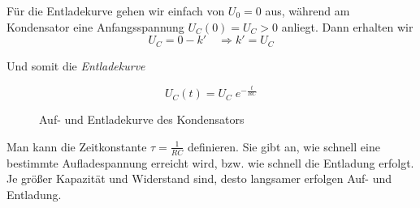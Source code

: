 \documentclass[a4paper,german,12pt,smallheadings]{scrartcl}
\begin{document}
Für die Entladekurve gehen wir einfach von $U_0 = 0$ aus, während am
Kondensator eine Anfangsspannung $U_C(0) = U_C > 0$ anliegt. Dann erhalten wir
\begin{equation}
  U_C = 0 - k' \quad \Rightarrow k' = U_C
\end{equation}

Und somit die \textit{Entladekurve}

\begin{equation}
  U_C(t) = U_C \; e^{-\frac{t}{RC}}
\end{equation}

\begin{figure}[H]
  \begin{center}
    \caption{Auf- und Entladekurve des Kondensators}
  \end{center}
\end{figure}

Man kann die Zeitkonstante $\tau = \frac{1}{RC}$ definieren. Sie gibt an, wie
schnell eine bestimmte Aufladespannung erreicht wird, bzw. wie schnell die
Entladung erfolgt. Je größer Kapazität und Widerstand sind, desto langsamer
erfolgen Auf- und Entladung.
\end{document}
